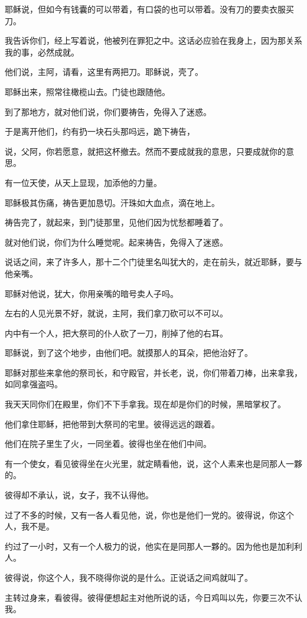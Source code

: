 \documentclass[12pt,oneside]{book}
\begin{document}
耶稣说，但如今有钱囊的可以带着，有口袋的也可以带着。没有刀的要卖衣服买刀。

我告诉你们，经上写着说，他被列在罪犯之中。这话必应验在我身上，因为那关系我的事，必然成就。

他们说，主阿，请看，这里有两把刀。耶稣说，壳了。

耶稣出来，照常往橄榄山去。门徒也跟随他。

到了那地方，就对他们说，你们要祷告，免得入了迷惑。

于是离开他们，约有扔一块石头那吗远，跪下祷告，

说，父阿，你若愿意，就把这杯撤去。然而不要成就我的意思，只要成就你的意思。

有一位天使，从天上显现，加添他的力量。

耶稣极其伤痛，祷告更加恳切。汗珠如大血点，滴在地上。

祷告完了，就起来，到门徒那里，见他们因为忧愁都睡着了。

就对他们说，你们为什么睡觉呢。起来祷告，免得入了迷惑。

说话之间，来了许多人，那十二个门徒里名叫犹大的，走在前头，就近耶稣，要与他亲嘴。

耶稣对他说，犹大，你用亲嘴的暗号卖人子吗。

左右的人见光景不好，就说，主阿，我们拿刀砍可以不可以。

内中有一个人，把大祭司的仆人砍了一刀，削掉了他的右耳。

耶稣说，到了这个地步，由他们吧。就摸那人的耳朵，把他治好了。

耶稣对那些来拿他的祭司长，和守殿官，并长老，说，你们带着刀棒，出来拿我，如同拿强盗吗。

我天天同你们在殿里，你们不下手拿我。现在却是你们的时候，黑暗掌权了。

他们拿住耶稣，把他带到大祭司的宅里。彼得远远的跟着。

他们在院子里生了火，一同坐着。彼得也坐在他们中间。

有一个使女，看见彼得坐在火光里，就定睛看他，说，这个人素来也是同那人一夥的。

彼得却不承认，说，女子，我不认得他。

过了不多的时候，又有一各人看见他，说，你也是他们一党的。彼得说，你这个人，我不是。

约过了一小时，又有一个人极力的说，他实在是同那人一夥的。因为他也是加利利人。

彼得说，你这个人，我不晓得你说的是什么。正说话之间鸡就叫了。

主转过身来，看彼得。彼得便想起主对他所说的话，今日鸡叫以先，你要三次不认我。
\end{document}
